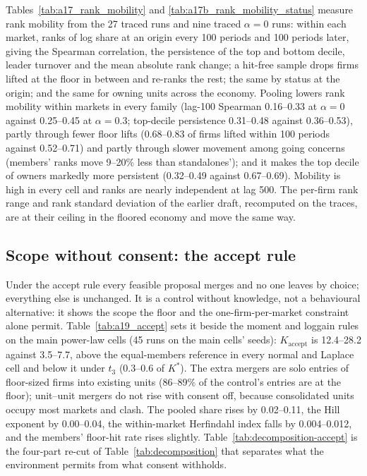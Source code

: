 Tables~\ref{tab:a17_rank_mobility} and \ref{tab:a17b_rank_mobility_status} measure rank mobility from the 27 traced runs and nine traced $\alpha = 0$ runs: within each market, ranks of log share at an origin every 100 periods and 100 periods later, giving the Spearman correlation, the persistence of the top and bottom decile, leader turnover and the mean absolute rank change; a hit-free sample drops firms lifted at the floor in between and re-ranks the rest; the same by status at the origin; and the same for owning units across the economy. Pooling lowers rank mobility within markets in every family (lag-100 Spearman 0.16--0.33 at $\alpha = 0$ against 0.25--0.45 at $\alpha = 0.3$; top-decile persistence 0.31--0.48 against 0.36--0.53), partly through fewer floor lifts (0.68--0.83 of firms lifted within 100 periods against 0.52--0.71) and partly through slower movement among going concerns (members' ranks move 9--20\% less than standalones'); and it makes the top decile of owners markedly more persistent (0.32--0.49 against 0.67--0.69). Mobility is high in every cell and ranks are nearly independent at lag 500. The per-firm rank range and rank standard deviation of the earlier draft, recomputed on the traces, are at their ceiling in the floored economy and move the same way.





\subsection{Scope without consent: the accept rule}\label{app:accept}

Under the accept rule every feasible proposal merges and no one leaves by choice; everything else is unchanged. It is a control without knowledge, not a behavioural alternative: it shows the scope the floor and the one-firm-per-market constraint alone permit. Table~\ref{tab:a19_accept} sets it beside the moment and loggain rules on the main power-law cells (45 runs on the main cells' seeds): $K_{\text{accept}}$ is 12.4--28.2 against 3.5--7.7, above the equal-members reference in every normal and Laplace cell and below it under $t_3$ (0.3--0.6 of $K^*$). The extra mergers are solo entries of floor-sized firms into existing units (86--89\% of the control's entries are at the floor); unit--unit mergers do not rise with consent off, because consolidated units occupy most markets and clash. The pooled share rises by 0.02--0.11, the Hill exponent by 0.00--0.04, the within-market Herfindahl index falls by 0.004--0.012, and the members' floor-hit rate rises slightly. Table~\ref{tab:decomposition-accept} is the four-part re-cut of Table~\ref{tab:decomposition} that separates what the environment permits from what consent withholds.

